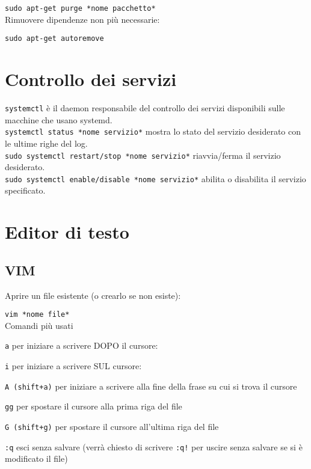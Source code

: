 \documentclass[]{report}
\begin{document}
\verb|sudo apt-get purge *nome pacchetto*|\\

\noindent Rimuovere dipendenze non più necessarie:

\verb|sudo apt-get autoremove|\\

\noindent 
\newpage

\section{Controllo dei servizi}
\verb|systemctl| è il daemon responsabile del controllo dei servizi disponibili sulle macchine che usano systemd.\\

\noindent \verb|systemctl status *nome servizio*| mostra lo stato del servizio desiderato con le ultime righe del log.\\

\noindent \verb|sudo systemctl restart/stop *nome servizio*| riavvia/ferma il servizio desiderato.\\

\noindent \verb|sudo systemctl enable/disable *nome servizio*| abilita o disabilita il servizio specificato.



\newpage
\section{Editor di testo}
\subsection{VIM}
Aprire un file esistente (o crearlo se non esiste):

\verb|vim *nome file*|\\

\noindent Comandi più usati

\verb|a| per iniziare a scrivere DOPO il cursore:

\verb|i| per iniziare a scrivere SUL cursore:

\verb|A (shift+a)| per iniziare a scrivere alla fine della frase su cui si trova il cursore

\verb|gg| per spostare il cursore alla prima riga del file

\verb|G (shift+g)| per spostare il cursore all'ultima riga del file

\verb|:q| esci senza salvare (verrà chiesto di scrivere \verb|:q!| per uscire senza salvare se si è modificato il file)
\end{document}
